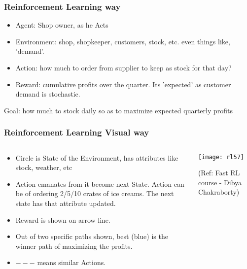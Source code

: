 \begin{frame}[fragile]\frametitle{Reinforcement Learning way}

\begin{itemize}
\item Agent: Shop owner, as he Acts
\item Environment: shop, shopkeeper, customers, stock, etc. even things like, 'demand'.
\item Action: how much to order from supplier to keep as stock for that day?
\item Reward: cumulative profits over the quarter. Its 'expected' as customer demand is stochastic.
\end{itemize}
Goal: how much to stock daily so as to maximize expected quarterly profits
\end{frame}

\begin{frame}[fragile]\frametitle{Reinforcement Learning Visual way}

\begin{columns}
\begin{column}{0.5\textwidth}

\begin{itemize}
\item Circle is State of the Environment, has attributes like stock, weather, etc
\item Action emanates from it become next State. Action can be of ordering 2/5/10 crates of ice creams. The next state has that attribute updated.
\item Reward is shown on arrow line.
\item Out of two specific paths shown, best (blue) is the winner path of maximizing the profits.
\item $---$ means similar Actions.
\end{itemize}

\end{column}
\begin{column}{0.5\textwidth}  %


\begin{center}
\texttt{[image: rl57]}

{\tiny (Ref: Fast RL course - Dibya Chakraborty)}

\end{center}
\end{column}
\end{columns}



\end{frame}

